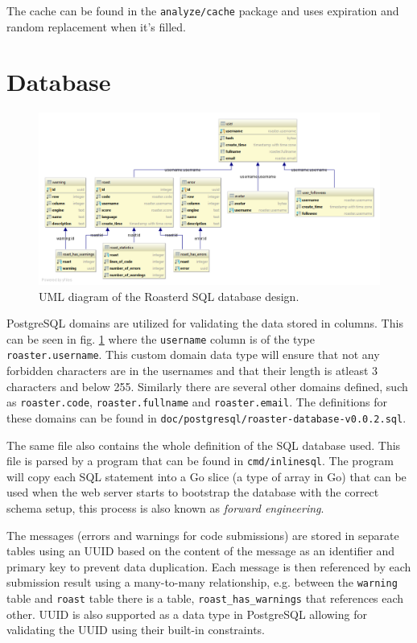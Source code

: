 \documentclass[12pt,a4paper]{report}
\begin{document}
The cache can be found in the \texttt{analyze/cache}\cite{roasterd-cache} package and uses expiration and random replacement when it's filled.

\section{Database}
\begin{figure}[H]
  \centering
  \includegraphics[width=16cm]{roaster-database-v0_0_1.png}
  \caption{UML diagram of the Roasterd SQL database design.}
  \label{fig:roasterd-database}
\end{figure}
PostgreSQL domains are utilized for validating the data stored in columns. This can be seen in fig. \ref{fig:roasterd-database} where the \texttt{username} column is of the type \texttt{roaster.username}. This custom domain data type will ensure that not any forbidden characters are in the usernames and that their length is atleast 3 characters and below 255. Similarly there are several other domains defined, such as \texttt{roaster.code}, \texttt{roaster.fullname} and \texttt{roaster.email}. The definitions for these domains can be found in \texttt{doc/postgresql/roaster-database-v0.0.2.sql}\cite{sql-def-line6}.

The same file also contains the whole definition of the SQL database used. This file is parsed by a program that can be found in \texttt{cmd/inlinesql}\cite{roasterd-cmd-inlinesql}. The program will copy each SQL statement into a Go slice (a type of array in Go) that can be used when the web server starts to bootstrap the database with the correct schema setup, this process is also known as \textit{forward engineering}.

\label{sec:database-messages}
The messages (errors and warnings for code submissions) are stored in separate tables using an UUID based on the content of the message as an identifier and primary key to prevent data duplication. Each message is then referenced by each submission result using a many-to-many relationship, e.g. between the \texttt{warning} table and \texttt{roast} table there is a table, \texttt{roast\_has\_warnings} that references each other. UUID is also supported as a data type in PostgreSQL\cite{pg-uuid} allowing for validating the UUID using their built-in constraints.
\end{document}
